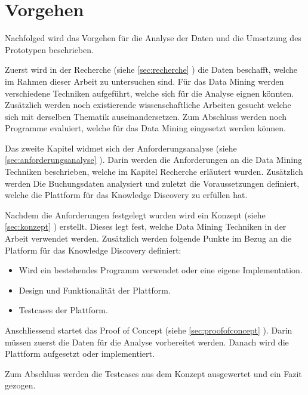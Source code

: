 \section{Vorgehen}
\label{sec:einletung:vorgehen}
Nachfolged wird das Vorgehen für die Analyse der Daten und die Umsetzung des Prototypen beschrieben.

Zuerst wird in der Recherche (siehe \cref{sec:recherche} ) die Daten beschafft, welche im Rahmen dieser Arbeit zu untersuchen sind. Für das Data Mining werden verschiedene Techniken aufgeführt, welche sich für die Analyse eignen könnten. Zusätzlich werden noch existierende wissenschaftliche Arbeiten gesucht welche sich mit derselben Thematik auseinandersetzen. Zum Abschluss werden noch Programme evaluiert, welche für das Data Mining eingesetzt werden können.

Das zweite Kapitel widmet sich der Anforderungsanalyse (siehe \cref{sec:anforderungsanalyse} ). Darin werden die Anforderungen an die Data Mining Techniken beschrieben, welche im Kapitel Recherche erläutert wurden. Zusätzlich werden Die Buchungsdaten analysiert und zuletzt die Voraussetzungen definiert, welche die Plattform für das Knowledge Discovery zu erfüllen hat.

Nachdem die Anforderungen festgelegt wurden wird ein Konzept (siehe \cref{sec:konzept} ) erstellt. Dieses legt fest, welche Data Mining Techniken in der Arbeit verwendet werden. Zusätzlich werden folgende Punkte im Bezug an die Platform für das Knowledge Discovery definiert:
\begin{itemize}
	\item Wird ein bestehendes Programm verwendet oder eine eigene Implementation.
	\item Design und Funktionalität der Plattform.
	\item Testcases der Plattform.
\end{itemize}

Anschliessend startet das Proof of Concept (siehe \cref{sec:proofofconcept} ). Darin müssen zuerst die Daten für die Analyse vorbereitet werden. Danach wird die Plattform aufgesetzt oder implementiert.

Zum Abschluss werden die Testcases aus dem Konzept ausgewertet und ein Fazit gezogen.

